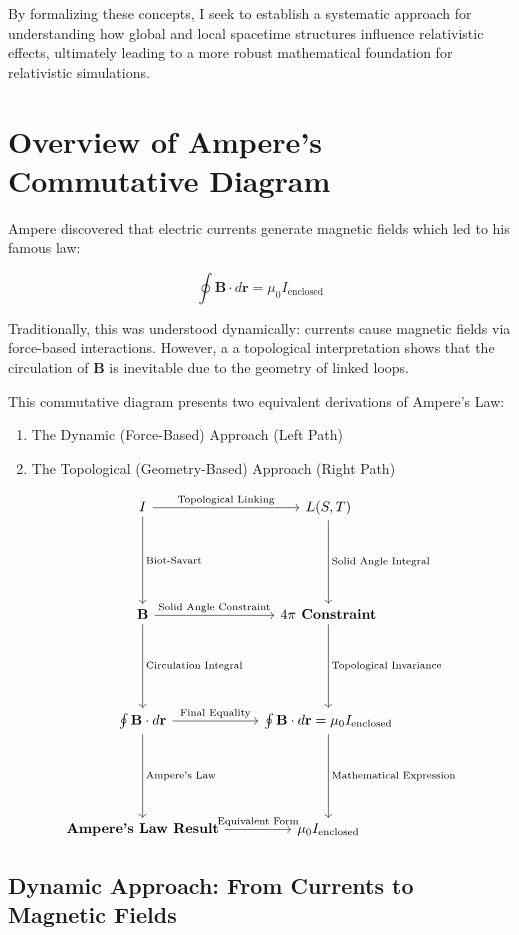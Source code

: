 \documentclass{article}
\begin{document}
By formalizing these concepts, I seek to establish a systematic approach for understanding how global and local spacetime structures influence relativistic effects, ultimately leading to a more robust mathematical foundation for relativistic simulations.


\clearpage
\section{Overview of Ampere’s Commutative Diagram}

Ampere discovered that electric currents generate magnetic fields which led to his famous law:

\[
\oint \mathbf{B} \cdot d\mathbf{r} = \mu_0 I_{\text{enclosed}}
\]

Traditionally, this was understood dynamically: currents cause magnetic fields via force-based interactions. However, a a topological interpretation shows that the circulation of \( \mathbf{B} \) is inevitable due to the geometry of linked loops.

This commutative diagram presents two equivalent derivations of Ampere’s Law:

\begin{enumerate}
    \item The Dynamic (Force-Based) Approach (Left Path)
    \item The Topological (Geometry-Based) Approach (Right Path)
\end{enumerate}

\[
\begin{tikzcd}[row sep=6em]
I 
    \arrow[d, "\text{Biot-Savart}"] 
    \arrow[r, "\text{Topological Linking}"] 
& L(S,T) 
    \arrow[d, "\text{Solid Angle Integral}"] \\
\mathbf{B} 
    \arrow[d, "\text{Circulation Integral}"] 
    \arrow[r, "\text{Solid Angle Constraint}"] 
& \textbf{\(4\pi\) Constraint} 
    \arrow[d, "\text{Topological Invariance}"] \\
\oint \mathbf{B} \cdot d\mathbf{r} 
    \arrow[d, "\text{Ampere's Law}"] 
    \arrow[r, "\text{Final Equality}"] 
& \oint \mathbf{B} \cdot d\mathbf{r} = \mu_0 I_{\text{enclosed}} 
    \arrow[d, "\text{Mathematical Expression}"] \\
\textbf{Ampere's Law Result}
    \arrow[r, "\text{Equivalent Form}"]
& \mu_0 I_{\text{enclosed}}
\end{tikzcd}
\]


\subsection{Dynamic Approach: From Currents to Magnetic Fields}
\end{document}
